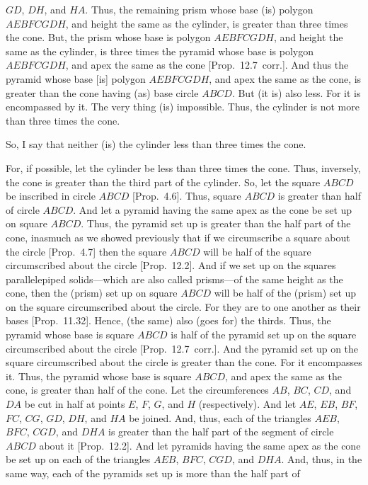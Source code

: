 \begin{Parallel}{}{}
{$GD$, $DH$, and $HA$. Thus, the remaining prism whose base (is) polygon $AEBFCGDH$, and height  the
same as the cylinder, is greater than three times the cone. But, the prism whose base is polygon $AEBFCGDH$,
and height the same as the cylinder,  is three times the pyramid whose base is polygon $AEBFCGDH$, and
apex the same as the cone [Prop.~12.7~corr.]. And thus the pyramid whose base [is] polygon 
$AEBFCGDH$, and apex the same as the cone, is greater than the cone having (as) base circle $ABCD$. But (it is)
also less. For it is encompassed by it. The very thing (is) impossible. Thus, the cylinder is not more than
three times the cone.

So, I say that neither (is) the cylinder less than three times the cone.

For, if possible, let the cylinder be less than three times the cone. Thus, inversely, the cone is greater than the third
part of the cylinder. So, let the square $ABCD$ be inscribed in circle $ABCD$  [Prop.~4.6]. Thus, square $ABCD$ is greater
than half of circle $ABCD$. 
And let a pyramid having the same apex as the cone be set up on square  $ABCD$. Thus, the pyramid set up
is greater than the half part of the cone, inasmuch as we showed previously that if we circumscribe a square
about the circle [Prop.~4.7] then the square $ABCD$ will be half of the square circumscribed about the circle [Prop.~12.2]. And if we set up   on the squares parallelepiped solids---which are also
called prisms---of the same height as the cone, then the (prism) set up on square $ABCD$ will be half of the (prism) set up on the square circumscribed
about the circle. For they are to one another as their bases [Prop.~11.32]. Hence, (the same) also (goes for) the thirds.  Thus, the pyramid whose base is square $ABCD$ is half of the pyramid set up on the square
circumscribed about the circle [Prop.~12.7~corr.]. And the pyramid set up on the square
circumscribed about the circle is greater than the cone. For it encompasses it. Thus, the pyramid whose
base is square $ABCD$, and apex the same as the cone, is greater than half of the cone. Let the circumferences $AB$,
$BC$, $CD$, and $DA$ be cut in half at points $E$, $F$, $G$, and $H$ (respectively).  And let $AE$, $EB$, $BF$,
$FC$, $CG$, $GD$, $DH$, and $HA$ be joined. And, thus, each of the triangles $AEB$, $BFC$,
$CGD$, and $DHA$ is greater than the half part of the segment of circle $ABCD$ about it [Prop.~12.2].
And let pyramids having the same apex as the cone be set up on each of the triangles $AEB$,
$BFC$, $CGD$, and $DHA$. And, thus, in the same way, each of the pyramids set up is more than the  half part of
}
\end{Parallel}
